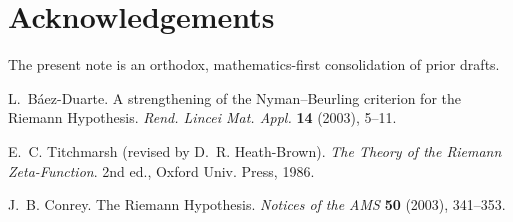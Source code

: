 \documentclass[11pt]{article}
\theoremstyle{remark}
\begin{document}
\section*{Acknowledgements}
The present note is an orthodox, mathematics-first consolidation of prior drafts.


\begin{thebibliography}{9}
L.~B\'aez-Duarte.
A strengthening of the Nyman--Beurling criterion for the Riemann Hypothesis.
\emph{Rend. Lincei Mat. Appl.} \textbf{14} (2003), 5--11.

E.~C. Titchmarsh (revised by D.~R. Heath-Brown).
\emph{The Theory of the Riemann Zeta-Function}. 2nd ed., Oxford Univ. Press, 1986.

J.~B. Conrey.
The Riemann Hypothesis.
\emph{Notices of the AMS} \textbf{50} (2003), 341--353.
\end{thebibliography}

\appendix

\end{document}
